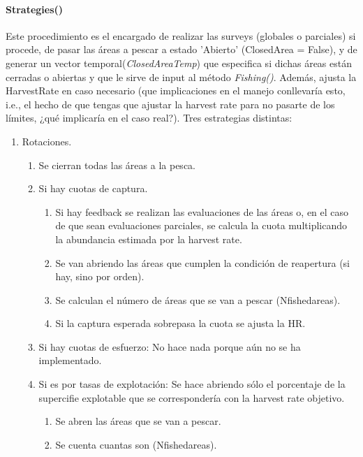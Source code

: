 			\paragraph{Strategies()}
			Este procedimiento es el encargado de realizar las surveys (globales o parciales) si procede, de pasar las áreas a pescar a estado 'Abierto' (ClosedArea = False), y de generar un vector temporal(\emph{ClosedAreaTemp}) que especifica si dichas áreas están cerradas o abiertas y que le sirve de input al método \emph{Fishing()}. Además, ajusta la HarvestRate en caso necesario (que implicaciones en el manejo conllevaría esto, i.e., el hecho de que tengas que ajustar la harvest rate para no pasarte de los límites, ¿qué implicaría en el caso real?).
				Tres estrategias distintas:
					\begin{enumerate}
						\item Rotaciones. 
							\begin{enumerate}
								\item Se cierran todas las áreas a la pesca. 
								\item Si hay cuotas de captura.
									\begin{enumerate}
										\item Si hay feedback se realizan las evaluaciones de las áreas o, en el caso de que sean evaluaciones parciales, se calcula la cuota multiplicando la abundancia estimada por la harvest rate.
										\item Se van abriendo las áreas que cumplen la condición de reapertura (si hay, sino por orden).
										\item Se calculan el número de áreas que se van a pescar (Nfishedareas).
										\item Si la captura esperada sobrepasa la cuota se ajusta la HR. 
									\end{enumerate}
								\item Si hay cuotas de esfuerzo: No hace nada porque aún no se ha implementado. 
								\item Si es por tasas de explotación: Se hace abriendo sólo el porcentaje de la supercifie explotable que se correspondería con la harvest rate objetivo. 
								\begin{enumerate}
									\item Se abren las áreas que se van a pescar.
									\item Se cuenta cuantas son (Nfishedareas).
								\end{enumerate}
							\end{enumerate}

\end{enumerate}
